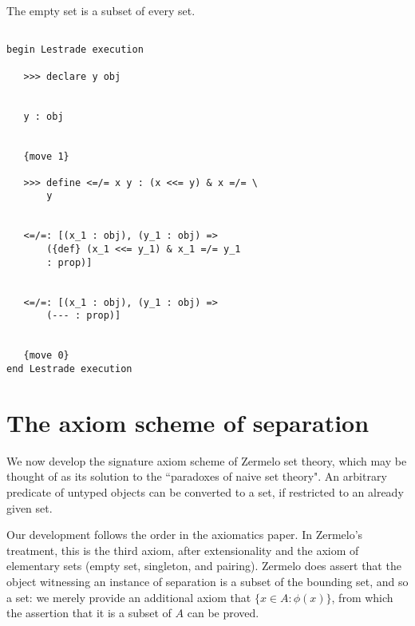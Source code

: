 \documentclass[12pt]{article}
\begin{document}
The empty set is a subset of every set.

\begin{verbatim}

begin Lestrade execution

   >>> declare y obj


   y : obj


   {move 1}

   >>> define <=/= x y : (x <<= y) & x =/= \
       y


   <=/=: [(x_1 : obj), (y_1 : obj) => 
       ({def} (x_1 <<= y_1) & x_1 =/= y_1 
       : prop)]


   <=/=: [(x_1 : obj), (y_1 : obj) => 
       (--- : prop)]


   {move 0}
end Lestrade execution
\end{verbatim}

\section{The axiom scheme of separation}

We now develop the signature axiom scheme of Zermelo set theory, which may be thought of as its solution to the ``paradoxes of naive set theory".  An arbitrary predicate of untyped objects can be converted to a set, if restricted to an already given set.

Our development follows the order in the axiomatics paper.  In Zermelo's treatment, this is the third axiom, after extensionality and the axiom of elementary sets
(empty set, singleton, and pairing).  Zermelo does assert that the object witnessing an instance of separation is a subset of the bounding set, and so a set:  we merely provide
an additional axiom that $\{x \in A : \phi(x)\}$, from which the assertion that it is a subset of $A$ can be proved.
\end{document}
